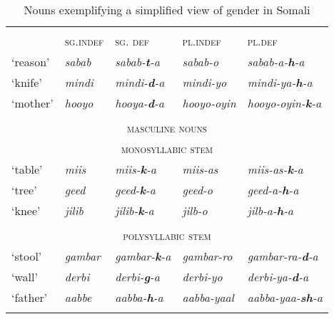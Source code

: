 \documentclass[output=paper]{langsci/langscibook}
\begin{document}
\begin{table}
\caption{Nouns exemplifying a simplified view of gender in Somali}
\label{tab:nilsson:6}

\begin{tabularx}{\textwidth}{llXlX}
\lsptoprule
\multicolumn{5}{c}{{\textsc{feminine nouns}}} \\
& {\textsc{sg.indef}} & {\textsc{sg. def}} & {\textsc{pl.indef}} & {\textsc{pl.def}}\\
\midrule
{‘reason’} & {\textit{sabab} } &  {\textit{sabab-}\textbf{\textit{t}}\textit{-a}} &{\textit{sabab-o}} & {\textit{sabab-a-}\textbf{\textit{h}}\textit{-a}}\\

{‘knife’} & {\textit{mindi}} & {\textit{mindi-}\textbf{\textit{d}}\textit{-a}} & {\textit{mindi-yo}} & {\textit{mindi-ya-}\textbf{\textit{h}}\textit{-a}}\\

{‘mother’} & {\textit{hooyo}} &{\textit{hooya-}\textbf{\textit{d}}\textit{-a}} & {\textit{hooyo-oyin}} & 
{\textit{hooyo-oyin-}\textbf{\textit{k}}\textit{-a}}\\

\\
\multicolumn{5}{c}{{\textsc{masculine nouns}}}\\
\multicolumn{5}{c}{{\textsc{monosyllabic stem}}}\\
\midrule

{‘table’} & {\textit{miis}} &  {\textit{miis-}\textbf{\textit{k}}\textit{-a}} & {\textit{miis-as}} &{\textit{miis-as-}\textbf{\textit{k}}\textit{-a}}\\

{‘tree’} & {\textit{geed}}  &  {\textit{geed-}\textbf{\textit{k}}\textit{-a}} & {\textit{geed-o}}  &{\textit{geed-a-}\textbf{\textit{h}}\textit{-a}}   \\

{‘knee’} & {\textit{jilib}} &  {\textit{jilib-}\textbf{\textit{k}}\textit{-a}}& {\textit{jilb-o}}  &{\textit{jilb-a-}\textbf{\textit{h}}\textit{-a}}\\
\\

\multicolumn{5}{c}{{\textsc{polysyllabic stem}}}\\
\midrule
{‘stool’} & {\textit{gambar}} & {\textit{gambar-}\textbf{\textit{k}}\textit{-a}} & {\textit{gambar-ro}}  &  {\textit{gambar-ra-}\textbf{\textit{d}}\textit{-a}} \\

{‘wall’} & {\textit{derbi}} &   {\textit{derbi-}\textbf{\textit{g}}\textit{-a}}  & {\textit{derbi-yo}}   & {\textit{derbi-ya-}\textbf{\textit{d}}\textit{-a}}   \\

{‘father’} & {\textit{aabbe}} & {\textit{aabba-}\textbf{\textit{h}}\textit{-a}}  & {\textit{aabba-yaal}} & {\textit{aabba-yaa-}\textbf{\textit{sh}}\textit{-a}}\\

\lspbottomrule
\end{tabularx}
\end{table} 
\end{document}
